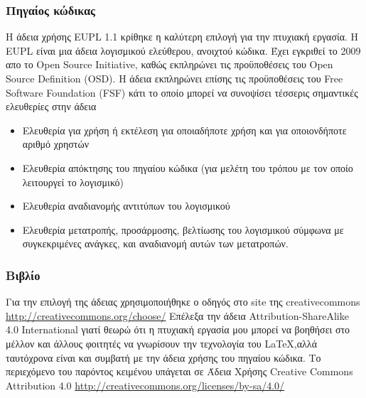 \subsubsection{Πηγαίος κώδικας}
Η άδεια χρήσης EUPL 1.1 κρίθηκε η καλύτερη επιλογή για την πτυχιακή εργασία. Η EUPL είναι μια άδεια λογισμικού ελεύθερου, ανοιχτού κώδικα. Έχει εγκριθεί το 2009 απο το Open Source Initiative, καθώς εκπληρώνει τις προϋποθέσεις  του Open Source Definition (OSD)\cite{osi-definition}. Η άδεια εκπληρώνει επίσης τις προϋποθέσεις του Free Software Foundation (FSF) κάτι το οποίο μπορεί να συνοψίσει τέσσερις σημαντικές ελευθερίες στην άδεια
\begin{itemize}
\item Ελευθερία για χρήση ή εκτέλεση για οποιαδήποτε χρήση και για οποιονδήποτε αριθμό χρηστών
\item Ελευθερία απόκτησης του πηγαίου κώδικα (για μελέτη του τρόπου με τον οποίο λειτουργεί το λογισμικό)
\item Ελευθερία αναδιανομής αντιτύπων του λογισμικού
\item Ελευθερία μετατροπής, προσάρμοσης, βελτίωσης του λογισμικού σύμφωνα με συγκεκριμένες ανάγκες, και αναδιανομή αυτών των μετατροπών.
\end{itemize}

\subsubsection{Βιβλίο}
Για την επιλογή της άδειας χρησιμοποιήθηκε ο οδηγός στο site της creativecommons \url{http://creativecommons.org/choose/}
Επέλεξα την άδεια Attribution-ShareAlike 4.0 International \ccbysa γιατί θεωρώ ότι η πτυχιακή εργασία μου μπορεί να βοηθήσει στο μέλλον και άλλους φοιτητές να γνωρίσουν την τεχνολογία του \LaTeX ,αλλά ταυτόχρονα είναι και συμβατή με την άδεια χρήσης του πηγαίου κώδικα.
\vfill
Το περιεχόμενο του παρόντος κειμένου υπάγεται σε Άδεια Χρήσης Creative Commons Attribution 4.0 \url{http://creativecommons.org/licenses/by-sa/4.0/}